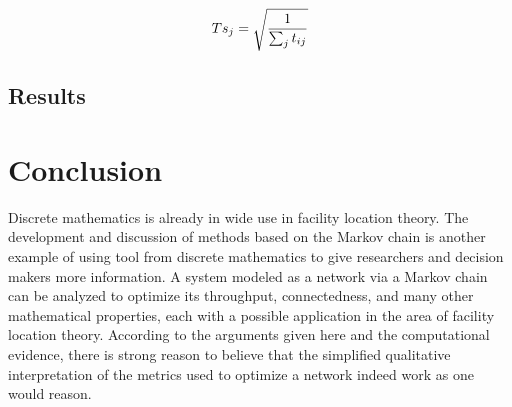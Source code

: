 \documentclass[twoside,twocolumn]{article}
\begin{document}
\begin{equation}
\begin{aligned}
Ts_j = \sqrt{1\over{\sum_j{t_{ij}}}}
\end{aligned}
\end{equation}

\subsection{Results}










\section{Conclusion}

Discrete mathematics is already in wide use in facility location theory. %
The development and discussion of methods based on the Markov chain is another example of using tool from discrete mathematics to give researchers and decision makers more information.
A system modeled as a network via a Markov chain can be analyzed to optimize its throughput, connectedness, and many other mathematical properties, each with a possible application in the area of facility location theory.
According to the arguments given here and the computational evidence, there is strong reason to believe that the simplified qualitative interpretation of the metrics used to optimize a network indeed work as one would reason.






\end{document}
